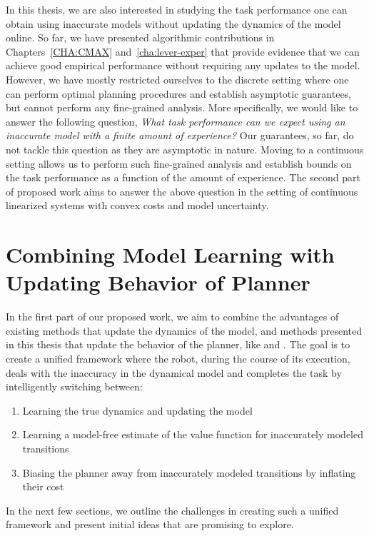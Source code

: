 In this thesis, we are also interested in studying the task
performance one can obtain using inaccurate models without
updating the dynamics of the model online. So far, we have presented
algorithmic contributions in Chapters~\ref{CHA:CMAX}
and~\ref{cha:lever-exper} that provide evidence that we can achieve 
good empirical performance without requiring any updates to the
model. However, we have mostly
restricted ourselves to the discrete setting where one can perform
optimal planning procedures and establish asymptotic guarantees, but
cannot perform any fine-grained analysis. More specifically, we would
like to answer the following question, \textit{What task performance
  can we expect using an inaccurate model with a finite amount of
  experience?} Our guarantees, so far, do not tackle this
question as they are asymptotic in nature. Moving to a continuous
setting allows us to perform such fine-grained analysis and establish
bounds on the task performance as a function of the amount of
experience. The second part of proposed work aims to answer the above
question in the setting of continuous linearized systems with convex
costs and model uncertainty.

\section{Combining Model Learning with Updating Behavior of Planner}
\label{sec:updat-dynam-model}

In the first part of our proposed work, we aim to combine the advantages of
existing methods that update the dynamics of the model, and methods
presented in this thesis that update the behavior of the planner, like
\cmax{} and \cmaxpp{}. The goal is to create a unified framework where
the robot, during the course of its execution, deals with the
inaccuracy in the dynamical model and completes the task by
intelligently switching between: 
\begin{enumerate}
\item Learning the true dynamics and updating the model
\item Learning a model-free estimate of the value function for
  inaccurately modeled transitions
\item Biasing the planner away from inaccurately modeled transitions
  by inflating their cost
\end{enumerate}

In the next few sections, we outline the challenges in creating such a
unified framework and present initial ideas that are promising to
explore.

